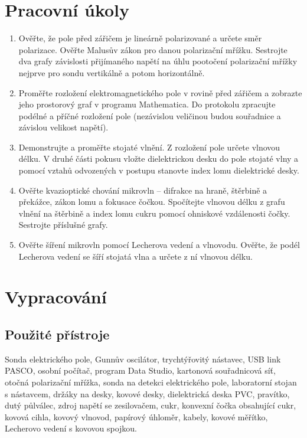 \documentclass[english]{article}
\begin{document}


\setlength{\parindent}{0.5cm}
\section{Pracovní úkoly}
	  \begin{enumerate}
			\item Ověřte, že pole před zářičem je lineárně polarizované a určete směr polarizace. Ověřte Malusův zákon pro danou polarizační mřížku. Sestrojte dva grafy závislosti přijímaného napětí na úhlu pootočení polarizační mřížky nejprve pro sondu vertikálně a potom horizontálně.
			\item Proměřte rozložení elektromagnetického pole v rovině před zářičem a zobrazte jeho prostorový graf v programu Mathematica. Do protokolu zpracujte podélné a příčné rozložení pole (nezávislou veličinou budou souřadnice a závislou velikost napětí).
			\item Demonstrujte a proměřte stojaté vlnění. Z rozložení pole určete vlnovou délku. V druhé části pokusu vložte dielektrickou desku do pole stojaté vlny a pomocí vztahů odvozených v postupu stanovte index lomu dielektrické desky.
			\item Ověřte kvazioptické chování mikrovln -- difrakce na hraně, štěrbině a překážce, zákon lomu a fokusace čočkou. Spočítejte vlnovou délku z grafu vlnění na štěrbině a index lomu cukru pomocí ohniskové vzdálenosti čočky. Sestrojte příslušné grafy.
			\item Ověřte šíření mikrovln pomocí Lecherova vedení a vlnovodu. Ověřte, že podél Lecherova vedení se šíří stojatá vlna a určete z ní vlnovou délku.
	  \end{enumerate}

\section{Vypracování}

	\subsection{Použité přístroje}
	 Sonda elektrického pole, Gunnův oscilátor, trychtýřovitý nástavec, USB link PASCO, osobní počítač, program Data Studio, kartonová souřadnicová síť, otočná polarizační mřížka, sonda na detekci elektrického pole,  laboratorní stojan s nástavcem, držáky na desky, kovové desky, dielektrická deska PVC, pravítko, dutý půlválec, zdroj napětí se zesilovačem, cukr, konvexní čočka obsahující cukr, kovová cihla, kovový vlnovod, papírový úhloměr, kabely, kovové měřítko, Lecherovo vedení s kovovou spojkou.
						
\end{document}
